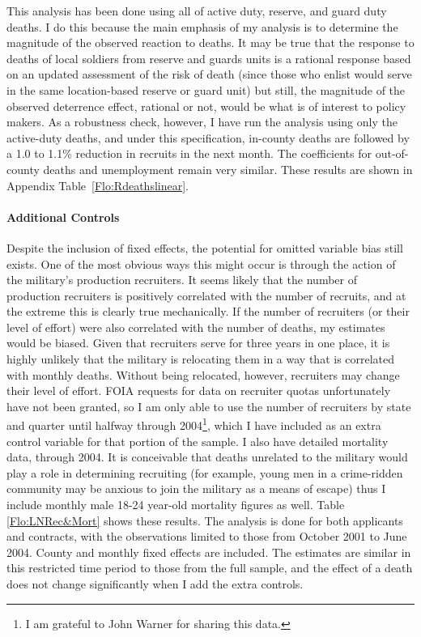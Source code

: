 \documentclass[12pt] {article}
\begin{document}
This analysis has been done using all of active duty, reserve, and
guard duty deaths. I do this because the main emphasis of my analysis
is to determine the magnitude of the observed reaction to deaths.
It may be true that the response to deaths of local soldiers from
reserve and guards units is a rational response based on an updated
assessment of the risk of death (since those who enlist would serve in the same location-based reserve or guard unit) but still, the magnitude of the observed
deterrence effect, rational or not, would be what is of interest to
policy makers. As a robustness check, however, I have run the analysis
using only the active-duty deaths, and under this specification, in-county
deaths are followed by a 1.0 to 1.1\% reduction in recruits in the
next month. The coefficients for out-of-county deaths and unemployment
remain very similar. These results are shown in Appendix Table~\ref{Flo:Rdeathslinear}. 

\paragraph{Additional Controls}

Despite the inclusion of fixed effects, the potential for omitted
variable bias still exists. One of the most obvious ways this might
occur is through the action of the military's production recruiters.
It seems likely that the number of production recruiters is positively
correlated with the number of recruits, and at the extreme this is
clearly true mechanically. If the number of recruiters (or their level
of effort) were also correlated with the number of deaths, my estimates
would be biased. Given that recruiters serve for three years in one
place, it is highly unlikely that the military is relocating them
in a way that is correlated with monthly deaths. Without being relocated,
however, recruiters may change their level of effort. FOIA requests for data on recruiter quotas unfortunately have not been granted, so I am only able to use the number of recruiters by state and quarter until halfway through 2004\footnote{I am grateful to John Warner for sharing this data.}, which I have included as an extra control variable for that portion of the sample. I also have detailed mortality data, through 2004. It is conceivable that deaths unrelated to
the military would play a role in determining recruiting (for example,
young men in a crime-ridden community may be anxious to join the military
as a means of escape) thus I include monthly male 18-24 year-old mortality figures
as well. Table \ref{Flo:LNRec&Mort} shows these results. The
analysis is done for both applicants and contracts, with the observations
limited to those from October 2001 to June 2004. County and monthly
fixed effects are included. The estimates are similar in this restricted time period to those from the full sample, and the effect of a death does not change significantly when I add the extra controls. %
\end{document}
